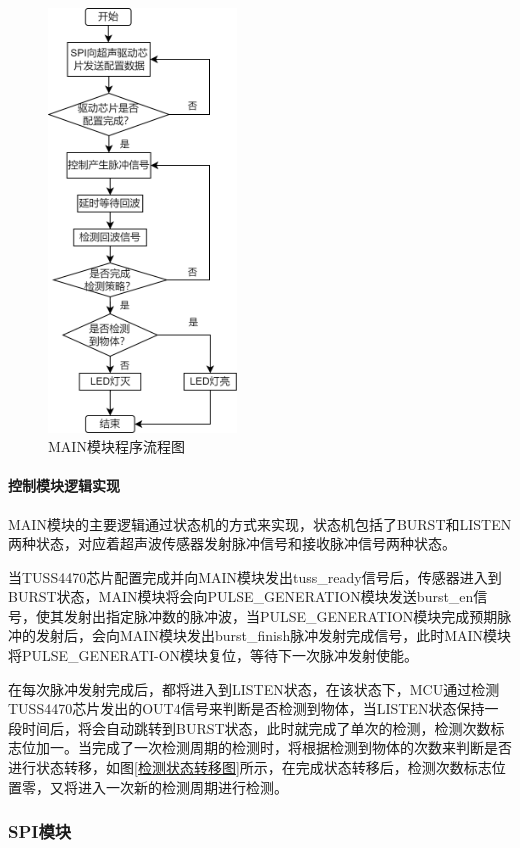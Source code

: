 \begin{figure}[ht]
	\centering
	\includegraphics[width=5cm]{figure/MAIN module flow chart.png}
	\caption{MAIN模块程序流程图}
	\label{MAIN模块程序流程图}
\end{figure}

\noindent
\paragraph{控制模块逻辑实现}
MAIN模块的主要逻辑通过状态机的方式来实现，状态机包括了BURST和LISTEN两种状态，对应着超声波传感器发射脉冲信号和接收脉冲信号两种状态。

当TUSS4470芯片配置完成并向MAIN模块发出tuss\_ready信号后，传感器进入到BURST状态，MAIN模块将会向PULSE\_GENERATION模块发送burst\_en信号，使其发射出指定脉冲数的脉冲波，当PULSE\_GENERATION模块完成预期脉冲的发射后，会向MAIN模块发出burst\_finish脉冲发射完成信号，此时MAIN模块将PULSE\_GENERATI-ON模块复位，等待下一次脉冲发射使能。

在每次脉冲发射完成后，都将进入到LISTEN状态，在该状态下，MCU通过检测TUSS4470芯片发出的OUT4信号来判断是否检测到物体，当LISTEN状态保持一段时间后，将会自动跳转到BURST状态，此时就完成了单次的检测，检测次数标志位加一。当完成了一次检测周期的检测时，将根据检测到物体的次数来判断是否进行状态转移，如图\ref{检测状态转移图}所示，在完成状态转移后，检测次数标志位置零，又将进入一次新的检测周期进行检测。

\subsubsection{SPI模块}
\noindent
